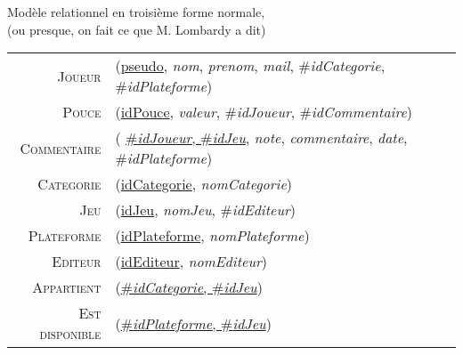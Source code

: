 \documentclass{article}
\newenvironment{mld}
{\par\begin{minipage}{\linewidth}\begin{tabular}{rp{\linewidth}}}
{\end{tabular}\end{minipage}\par}
\newcommand{\relat}[1]{\textsc{#1}}
\newcommand{\attr}[1]{\emph{#1}}
\newcommand{\prim}[1]{\uline{#1}}
\newcommand{\foreign}[1]{\#\textsl{#1}}
\begin{document}
\begin{center}
Mod\`ele relationnel en troisi\`eme forme normale,\\
(ou presque, on fait ce que M. Lombardy a dit)\\
\end{center}

\begin{mld}
  \relat{Joueur} & (\prim{pseudo}, \attr{nom}, \attr{prenom}, \attr{mail}, \foreign{idCategorie}, \foreign{idPlateforme})\\
  \relat{Pouce} & (\prim{idPouce}, \attr{valeur}, \foreign{idJoueur}, \foreign{idCommentaire})\\
  \relat{Commentaire} & ( \prim{\foreign{idJoueur}, \foreign{idJeu}}, \attr{note}, \attr{commentaire}, \attr{date}, \foreign{idPlateforme})\\
  \relat{Categorie} & (\prim{idCategorie}, \attr{nomCategorie})\\
  \relat{Jeu} & (\prim{idJeu}, \attr{nomJeu}, \foreign{idEditeur})\\
  \relat{Plateforme} & (\prim{idPlateforme}, \attr{nomPlateforme})\\
  \relat{Editeur} & (\prim{idEditeur}, \attr{nomEditeur})\\
  \relat{Appartient} & (\prim{\foreign{idCategorie}, \foreign{idJeu}})\\
  \relat{Est disponible} & (\prim{\foreign{idPlateforme}, \foreign{idJeu}})\\
\end{mld}
\end{document}
